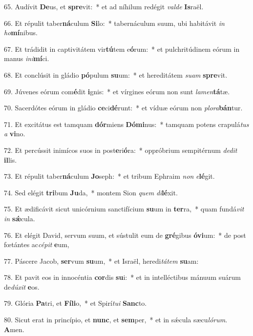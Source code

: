 65. Audívit \textbf{De}us, et \textbf{spre}vit:~*  et ad níhilum redégit \textit{val}\textit{de} \textbf{Is}raël.\

66. Et répulit taber\textbf{ná}culum \textbf{Si}lo:~*  tabernáculum suum, ubi habitávit \textit{in} \textit{ho}\textbf{mí}nibus.\

67. Et trádidit in captivitátem vir\textbf{tú}tem e\textbf{ó}rum:~*  et pulchritúdinem eórum in manus \textit{in}\textit{i}\textbf{mí}ci.\

68. Et conclúsit in gládio \textbf{pó}pulum \textbf{su}um:~*  et hereditátem \textit{su}\textit{am} \textbf{spre}vit.\

69. Júvenes eórum com\textbf{é}dit \textbf{i}gnis:~*  et vírgines eórum non sunt \textit{la}\textit{men}\textbf{tá}tæ.\

70. Sacerdótes eórum in gládio \textbf{ce}ci\textbf{dé}runt:~*  et víduæ eórum non \textit{plo}\textit{ra}\textbf{bán}tur.\

71. Et excitátus est tamquam \textbf{dór}miens \textbf{Dó}\textbf{mi}nus:~*  tamquam potens crapulá\textit{tus} \textit{a} \textbf{vi}no.\

72. Et percússit inimícos suos in post\textbf{e}ri\textbf{ó}ra:~*  oppróbrium sempitérnum \textit{de}\textit{dit} \textbf{il}lis.\

73. Et répulit taber\textbf{ná}culum \textbf{Jo}seph:~*  et tribum Ephraim \textit{non} \textit{e}\textbf{lé}git.\

74. Sed elégit \textbf{tri}bum \textbf{Ju}da,~*  montem Sion \textit{quem} \textit{di}\textbf{lé}xit.\

75. Et ædificávit sicut unicórnium sanctifícium \textbf{su}um in \textbf{ter}ra,~*  quam fundá\textit{vit} \textit{in} \textbf{sǽ}cula.\

76. Et elégit David, servum suum, et sústulit eum de \textbf{gré}gibus \textbf{ó}\textbf{vi}um:~*  de post fœtántes ac\textit{cé}\textit{pit} \textbf{e}um,\

77. Páscere Jacob, \textbf{ser}vum \textbf{su}um,~*  et Israël, heredi\textit{tá}\textit{tem} \textbf{su}am:\

78. Et pavit eos in innocéntia \textbf{cor}dis \textbf{su}i:~*  et in intelléctibus mánuum suárum de\textit{dú}\textit{xit} \textbf{e}os.\

79. Glória \textbf{Pa}tri, et \textbf{Fí}\textbf{li}o,~*  et Spirí\textit{tu}\textit{i} \textbf{Sanc}to.\

80. Sicut erat in princípio, et \textbf{nunc}, et \textbf{sem}per,~*  et in sǽcula sæcu\textit{ló}\textit{rum}. \textbf{A}men.\

